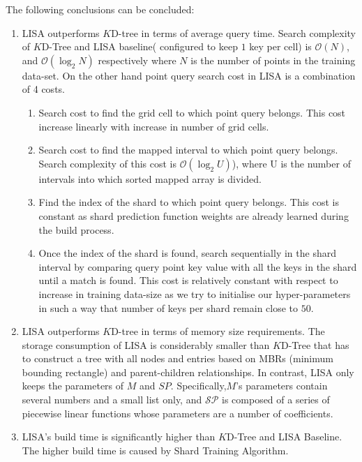 \begin{mscconclusion}
The following conclusions can be concluded:

	\begin{enumerate}
    \item LISA outperforms $K$D-tree in terms of average query time. Search complexity of $K$D-Tree and LISA baseline( configured to keep $1$ key per cell) is $\mathcal{O}(N)$, and $\mathcal{O}(\log_{2}N)$ respectively where $N$ is the number of points in the training data-set. On the other hand point query search cost in LISA is a combination of 4 costs.
    \begin{enumerate}
    \item Search cost to find the grid cell to which point query belongs. This cost increase linearly with increase in number of grid cells. 
    \item Search cost to find the mapped interval to which point query belongs. Search complexity of this cost is $\mathcal{O}(\log_{2}U)$), where U is the number of intervals into which sorted mapped array is divided. 
    \item Find the index of the shard to which point query belongs. This cost is constant as shard prediction function weights are already learned during the build process. 
    \item Once the index of the shard is found, search sequentially in the shard interval by comparing query point key value with all the keys in the shard until a match is found. This cost is relatively constant with respect to increase in training data-size as we try to initialise our hyper-parameters in such a way that number of keys per shard remain close to $50$.
\end{enumerate}
    
    \item LISA outperforms $K$D-tree in terms of memory size requirements. The storage consumption of LISA is considerably smaller than $K$D-Tree that has to construct a tree with all nodes and entries based on MBRs (minimum bounding rectangle)  and parent-children relationships. In contrast, LISA only keeps the parameters of $M$ and $SP$. Specifically,$M$’s parameters contain several numbers and a small list only, and $\mathcal{SP}$ is composed of a series of piecewise linear functions whose parameters are a number of coefficients.
    
    \item LISA's build time is significantly higher than $K$D-Tree and LISA Baseline. The higher build time is caused by Shard Training Algorithm.  
\end{enumerate}

\end{mscconclusion}

